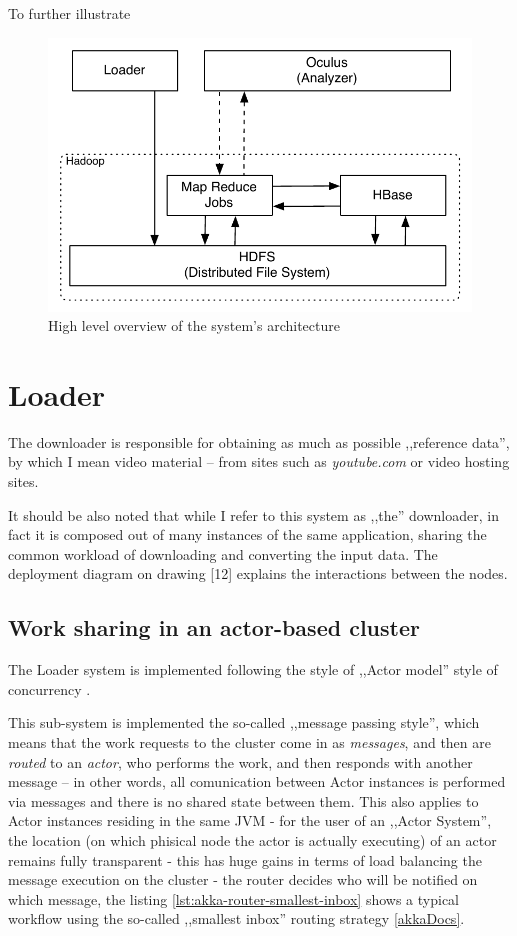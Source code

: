 To further illustrate 

\begin{figure}[hc!]
 \centering
  \includegraphics[scale=0.9]{./diagrams/high-level-system.pdf}
  \caption{High level overview of the system's architecture}
  \label{fig:system-overview}
\end{figure}

\section{Loader}
The downloader is responsible for obtaining as much as possible ,,reference data'', by which I mean video material -- from sites such as \textit{youtube.com} or video hosting sites.

It should be also noted that while I refer to this system as ,,the'' downloader, in fact it is composed out of many instances of the same application, sharing the common workload of downloading and converting the input data. The deployment diagram on drawing [12] explains the interactions between the nodes.

\subsection{Work sharing in an actor-based cluster}
The Loader system is implemented following the style of ,,Actor model'' style of concurrency \cite{actor-model}.

This sub-system is implemented the so-called ,,message passing style'', which means that the work requests to the cluster come in as \textit{messages}, and then are \textit{routed} to an \textit{actor}, who performs the work, and then responds with another message -- in other words, all comunication between Actor instances is performed via messages and there is no shared state between them. 
This also applies to Actor instances residing in the same JVM - for the user of an ,,Actor System'', the location (on which phisical node the actor is actually executing) of an actor remains fully transparent - this has huge gains in terms of load balancing the message execution on the cluster - the router decides who will be notified on which message, the listing \ref{lst:akka-router-smallest-inbox} shows a typical workflow using the so-called ,,smallest inbox'' routing strategy \ref{akkaDocs}.

